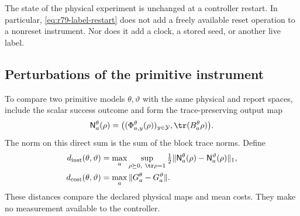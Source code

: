 The state of the physical experiment is unchanged at a controller
restart.  In particular, \eqref{eq:r79-label-restart} does not add
a freely available reset operation to a nonreset instrument.
Nor does it add a clock, a stored seed, or another live label.

\subsection{Perturbations of the primitive instrument}

To compare two primitive models $\theta,\vartheta$ with the same
physical and report spaces, include the scalar success outcome
and form the trace-preserving output map
\[
 \mathsf N^\theta_a(\rho)=
       \bigl((\Phi^\theta_{a,y}(\rho))_{y\in\mathcal Y},
                         \tr(B^\theta_a\rho)\bigr).
\]
The norm on this direct sum is the sum of the block trace norms.
Define
\begin{align}
 d_{\rm inst}(\theta,\vartheta)
  &=\max_a\sup_{\rho\succeq0,\ \tr\rho=1}
       \tfrac12\|\mathsf N^\theta_a(\rho)
                      -\mathsf N^\vartheta_a(\rho)\|_1,
                 \label{eq:r79-instrument-distance}\\
 d_{\rm cost}(\theta,\vartheta)
  &=\max_a\|G^\theta_a-G^\vartheta_a\|.
                 \label{eq:r79-cost-distance}
\end{align}
These distances compare the declared physical maps and mean costs.
They make no measurement available to the controller.

